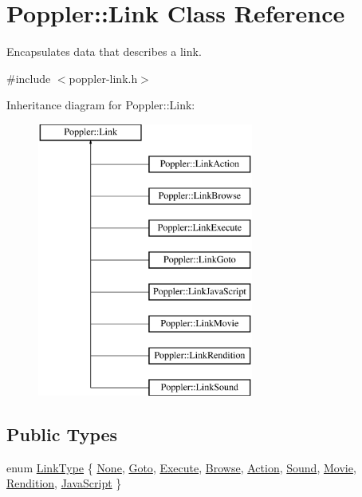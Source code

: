 \hypertarget{class_poppler_1_1_link}{}\section{Poppler\+:\+:Link Class Reference}
\label{class_poppler_1_1_link}


Encapsulates data that describes a link.  




{\ttfamily \#include $<$poppler-\/link.\+h$>$}

Inheritance diagram for Poppler\+:\+:Link\+:\begin{figure}[H]
\begin{center}
\leavevmode
\includegraphics[height=9.000000cm]{class_poppler_1_1_link}
\end{center}
\end{figure}
\subsection*{Public Types}
\begin{DoxyCompactItemize}
\item 
enum \hyperlink{class_poppler_1_1_link_af0dacfa77a548bb043dbae4bb9dc6c1e}{Link\+Type} \{ \newline
\hyperlink{class_poppler_1_1_link_af0dacfa77a548bb043dbae4bb9dc6c1eacf75996fae8037e8f7471cb584fe5c9a}{None}, 
\hyperlink{class_poppler_1_1_link_af0dacfa77a548bb043dbae4bb9dc6c1ea6afc2608d1f430835043bfe337f4622c}{Goto}, 
\hyperlink{class_poppler_1_1_link_af0dacfa77a548bb043dbae4bb9dc6c1eaf8af25fd8fe70956b778c60bd76791d0}{Execute}, 
\hyperlink{class_poppler_1_1_link_af0dacfa77a548bb043dbae4bb9dc6c1ea04fb516504b7fee10e85e912ad135f8f}{Browse}, 
\newline
\hyperlink{class_poppler_1_1_link_af0dacfa77a548bb043dbae4bb9dc6c1ea177c9a547cab92210d37c760adc15b4e}{Action}, 
\hyperlink{class_poppler_1_1_link_af0dacfa77a548bb043dbae4bb9dc6c1eacca4941120e5828c81b00cc9ba0e79e7}{Sound}, 
\hyperlink{class_poppler_1_1_link_af0dacfa77a548bb043dbae4bb9dc6c1eac35ddfea8c33eca84d927a2a5ed9b273}{Movie}, 
\hyperlink{class_poppler_1_1_link_af0dacfa77a548bb043dbae4bb9dc6c1eaa12a9017df2c403a7c76b36e13afa5d7}{Rendition}, 
\newline
\hyperlink{class_poppler_1_1_link_af0dacfa77a548bb043dbae4bb9dc6c1ea390c5bdea33ed6a41df50fa3203982be}{Java\+Script}
 \}
\end{DoxyCompactItemize}
